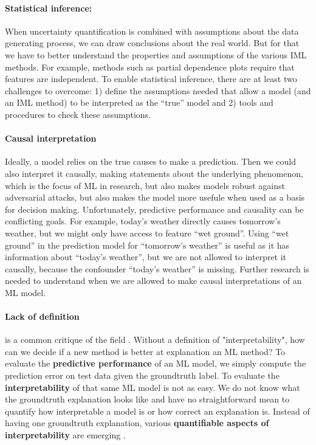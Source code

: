 \documentclass[runningheads]{llncs}
\begin{document}
\paragraph{Statistical inference:}
When uncertainty quantification is combined with assumptions about the data generating process, we can draw conclusions about the real world.
But for that we have to better understand the properties and assumptions of the various IML methods.
For example, methods such as partial dependence plots require that features are independent.
To enable statistical inference, there are at least two challenges to overcome: 1) define the assumptions needed that allow a model (and an IML method) to be interpreted as the \enquote{true} model and 2) tools and procedures to check these assumptions.

\paragraph{Causal interpretation}
Ideally, a model relies on the true causes to make a prediction.
Then we could also interpret it causally, making statements about the underlying phenomenon, which is the focus of ML in research, but also makes models robust against adversarial attacks, but also makes the model more usefule when used as a basis for decision making.
Unfortunately, predictive performance and causality can be conflicting goals.
For example, today's weather directly causes tomorrow's weather, but we might only have access to feature \enquote{wet ground}.
Using \enquote{wet ground} in the prediction model for \enquote{tomorrow's weather} is useful as it has information about \enquote{today's weather}, but we are not allowed to interpret it causally, because the confounder \enquote{today's weather} is missing.
Further research is needed to understand when we are allowed to make causal interpretations of an ML model.

\paragraph{Lack of definition} is a common critique of the field \cite{lipton2018mythos,doshi2017towards}.
Without a definition of "interpretability", how can we decide if a new method is better at explanation an ML method?
To evaluate the \textbf{predictive performance} of an ML model, we simply compute the prediction error on test data given the groundtruth label.
To evaluate the \textbf{interpretability} of that same ML model is not as easy.
We do not know what the groundtruth explanation looks like and have no straightforward mean to quantify how interpretable a model is or how correct an explanation is.
Instead of having one groundtruth explanation, various \textbf{quantifiable aspects of interpretability} are emerging \cite{poursabzi2018manipulating,philipp2018measuring,molnar2019quantifying,hauenstein2018computing,zhou2018measuring,akaike1998information,schwarz1978estimating,poursabzi2018manipulating,dhurandhar2017tip,friedler2019assessing}.
\end{document}
